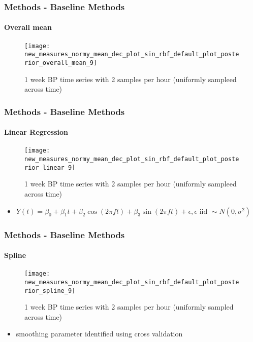 \documentclass[
	8pt, %
]{beamer}
\begin{document}
\begin{frame}
	\frametitle{Methods - Baseline Methods}
	\framesubtitle{Overall mean}

		\begin{figure}
			\texttt{[image: new\_measures\_normy\_mean\_dec\_plot\_sin\_rbf\_default\_plot\_posterior\_overall\_mean\_9]}
			\caption{1 week BP time series with 2 samples per hour (uniformly sampleed across time)}
		\end{figure}

\end{frame}

%

\begin{frame}
	\frametitle{Methods - Baseline Methods}
	\framesubtitle{Linear Regression}
		\begin{figure}
			\texttt{[image: new\_measures\_normy\_mean\_dec\_plot\_sin\_rbf\_default\_plot\_posterior\_linear\_9]}
			\caption{1 week BP time series with 2 samples per hour (uniformly sampleed across time)}
		\end{figure}

	\begin{itemize}
		\item $Y(t) = \beta_0 + \beta_1 t + \beta_2 \cos(2 \pi f t) + \beta_3 \sin(2 \pi f t) + \epsilon, \epsilon \text{ iid } \sim N(0, \sigma^2)$
	\end{itemize}

\end{frame}

\begin{frame}
	\frametitle{Methods - Baseline Methods}
	\framesubtitle{Spline}
		\begin{figure}
			\texttt{[image: new\_measures\_normy\_mean\_dec\_plot\_sin\_rbf\_default\_plot\_posterior\_spline\_9]}
			\caption{1 week BP time series with 2 samples per hour (uniformly sampled across time)}
		\end{figure}

	\begin{itemize}
		\item smoothing parameter identified using cross validation
	\end{itemize}

\end{frame}
\end{document}
